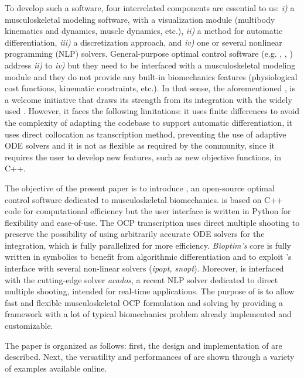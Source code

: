 To develop such a software, four interrelated components are essential to us: \textit{i)} a musculoskeletal modeling software, with a visualization module (multibody kinematics and dynamics, muscle dynamics, etc.), \textit{ii)} a method for automatic differentiation, \textit{iii)} a discretization approach, and \textit{iv)} one or several nonlinear programming (NLP) solvers. 
General-purpose optimal control software (e.g. \gpopsii [\addref], \muscodii [\addref], \acado [\addref]) address \textit{ii)} to \textit{iv)} but they need to be interfaced with a musculoskeletal modeling module and they do not provide any built-in biomechanics features (physiological cost functions, kinematic constraints, etc.). 
In that sense, the aforementioned \moco, is a welcome initiative that draws its strength from its integration with the widely used \opensim.
However, it faces the following limitations: it uses finite differences to avoid the complexity of adapting the \opensim codebase to support automatic differentiation, it uses direct collocation as transcription method, preventing the use of adaptive ODE solvers and it is not as flexible as required by the community, since it requires the user to develop new features, such as new objective functions, in C++. 

The objective of the present paper is to introduce \bioptim, an open-source optimal control software dedicated to musculoskeletal biomechanics.
\bioptim is based on C++ code for computational efficiency but the user interface is written in Python for flexibility and ease-of-use. 
The OCP transcription uses direct multiple shooting to preserve the possibility of using arbitrarily accurate ODE solvers for the integration, which is fully parallelized for more efficiency.
\textit{Bioptim's} core is fully written in \casadi symbolics to benefit from algorithmic differentiation and to exploit \casadi 's interface with several non-linear solvers (\textit{ipopt, snopt}).
Moreover, \bioptim is interfaced with the cutting-edge solver \textit{acados}, a recent NLP solver dedicated to direct multiple shooting, intended for real-time applications.
The purpose of \bioptim is to allow fast and flexible musculoskeletal OCP formulation and solving by providing a framework with a lot of typical biomechanics problem already implemented and customizable.

The paper is organized as follows: first, the design and implementation of \bioptim are described.
Next, the versatility and performances of \bioptim are shown through a variety of examples available online. 
